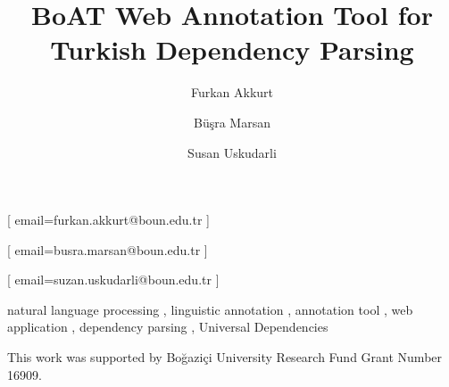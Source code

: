 \documentclass[
]{ceurart}
\begin{document}


\title{BoAT Web Annotation Tool for Turkish Dependency Parsing}

\author[1]{Furkan Akkurt}[%
email=furkan.akkurt@boun.edu.tr
]

\author[2]{Büşra Marsan}[%
email=busra.marsan@boun.edu.tr
]

\author[1]{Susan Uskudarli}[%
email=suzan.uskudarli@boun.edu.tr
]

\address[1]{ Department of Computer Engineering, Bogazici University, Istanbul, Turkey }
\address[1]{ Department of Linguistics, Bogazici University, Istanbul, Turkey }



\begin{keywords}
natural language processing \sep
linguistic annotation \sep
annotation tool \sep
web application \sep
dependency parsing \sep
Universal Dependencies
\end{keywords}

\maketitle










\begin{acknowledgments}
This work was supported by Boğaziçi University Research Fund Grant Number 16909.
\end{acknowledgments}


\end{document}
